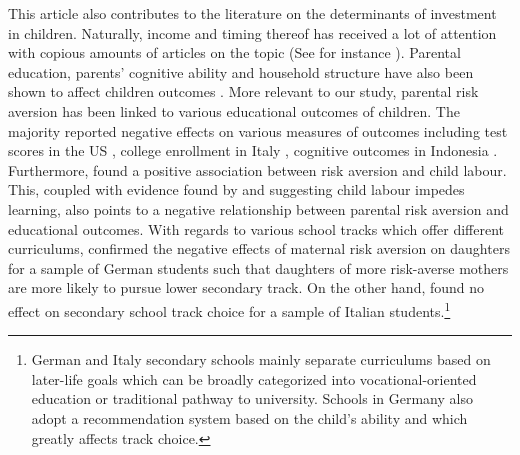 \documentclass[emulatestandardclasses, 10pt, abstract = true]{scrartcl}
\begin{document}
This article also contributes to the literature on the determinants of investment in children. Naturally, income and timing thereof has received a lot of attention with copious amounts of articles on the topic (See for instance \citet{brooks1997effects, yeung2002money, carneiro2003human,dahl2012impact, carneiro2016partial, attanasio2020human}). Parental education, parents' cognitive ability and household structure have also been shown to affect children outcomes \citep{chevalier2004parental, brown2004family, guryan2008parental, schady2011parents}. More relevant to our study, parental risk aversion has been linked to various educational outcomes of children. The majority reported negative effects on various measures of outcomes including test scores in the US \citep{brown2012parental}, college enrollment in Italy \citep{checchi2014parents}, cognitive outcomes in Indonesia \citep{hartarto2023parental}. Furthermore, \citet{frempong2021risk} found a positive association between risk aversion and child labour. This, coupled with evidence found by \citet{HEADY2003385} and \citet{bezerra2009impact} suggesting child labour impedes learning, also points to a negative relationship between parental risk aversion and educational outcomes. With regards to various school tracks which offer different curriculums, \citet{wolfel2012parental} confirmed the negative effects of maternal risk aversion on daughters for a sample of German students such that daughters of more risk-averse mothers are more likely to pursue lower secondary track. On the other hand, \citet{leonardi2007parents} found no effect on secondary school track choice for a sample of Italian students.\footnote{German and Italy secondary schools mainly separate curriculums based on later-life goals which can be broadly categorized into vocational-oriented education or traditional pathway to university. Schools in Germany also adopt a recommendation system based on the child's ability and which greatly affects track choice.}   
\end{document}
